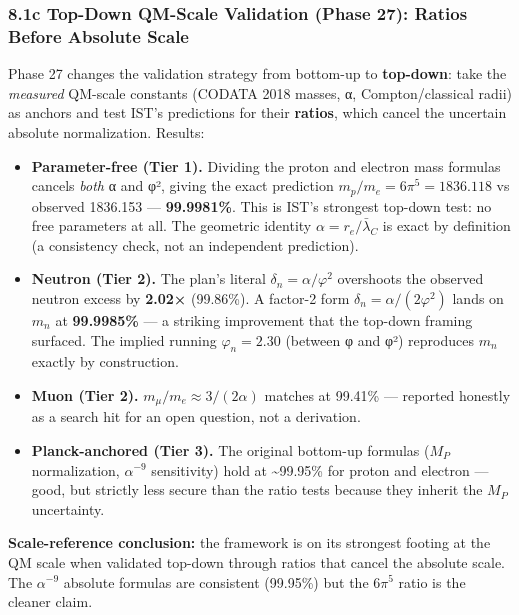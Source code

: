\documentclass[
]{article}
\providecommand{\tightlist}{%
  \setlength{\itemsep}{0pt}\setlength{\parskip}{0pt}}
\begin{document}
\subsubsection{8.1c Top-Down QM-Scale Validation (Phase 27): Ratios
Before Absolute
Scale}\label{c-top-down-qm-scale-validation-phase-27-ratios-before-absolute-scale}

Phase 27 changes the validation strategy from bottom-up to
\textbf{top-down}: take the \emph{measured} QM-scale constants (CODATA
2018 masses, α, Compton/classical radii) as anchors and test IST's
predictions for their \textbf{ratios}, which cancel the uncertain
absolute normalization. Results:

\begin{itemize}
\tightlist
\item
  \textbf{Parameter-free (Tier 1).} Dividing the proton and electron
  mass formulas cancels \emph{both} α and φ², giving the exact
  prediction \(m_p/m_e = 6\pi^5 = 1836.118\) vs observed 1836.153 ---
  \textbf{99.9981\%}. This is IST's strongest top-down test: no free
  parameters at all. The geometric identity
  \(\alpha = r_e/\bar\lambda_C\) is exact by definition (a consistency
  check, not an independent prediction).
\item
  \textbf{Neutron (Tier 2).} The plan's literal
  \(\delta_n = \alpha/\varphi^2\) overshoots the observed neutron excess
  by \textbf{2.02×} (99.86\%). A factor-2 form
  \(\delta_n = \alpha/(2\varphi^2)\) lands on \(m_n\) at
  \textbf{99.9985\%} --- a striking improvement that the top-down
  framing surfaced. The implied running \(\varphi_n = 2.30\) (between φ
  and φ²) reproduces \(m_n\) exactly by construction.
\item
  \textbf{Muon (Tier 2).} \(m_\mu/m_e \approx 3/(2\alpha)\) matches at
  99.41\% --- reported honestly as a search hit for an open question,
  not a derivation.
\item
  \textbf{Planck-anchored (Tier 3).} The original bottom-up formulas
  (\(M_P\) normalization, \(\alpha^{-9}\) sensitivity) hold at
  \textasciitilde99.95\% for proton and electron --- good, but strictly
  less secure than the ratio tests because they inherit the \(M_P\)
  uncertainty.
\end{itemize}

\textbf{Scale-reference conclusion:} the framework is on its strongest
footing at the QM scale when validated top-down through ratios that
cancel the absolute scale. The \(\alpha^{-9}\) absolute formulas are
consistent (99.95\%) but the \(6\pi^5\) ratio is the cleaner claim.
\end{document}
